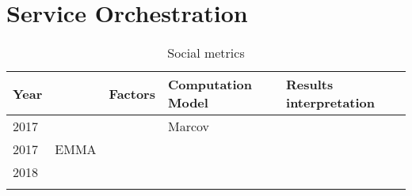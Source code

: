 \onecolumn
\section{Service Orchestration}
\setlength{\hoffset}{-.5in}


\begin{longtable}{lllll}
	Year  & \                                              & \textbf{Factors}           & \textbf{Computation Model}             & \textbf{Results interpretation}                               \\\hline
	2017  & \cite{yuzehuang_timeaware_2017}                &            			    & Marcov                                 & 											                      \\
	2017  & EMMA \cite{duhart_organic_2017}				   &     						&										 &																 \\\hline
	2018  & \cite{zarca_enhancing_2018}                    & 			                &                                        & 											                       \\\hline

	
\caption{Social metrics}
\end{longtable}

\clearpage
\newpage
\setlength{\hoffset}{-0in}
\twocolumn
